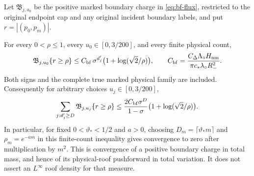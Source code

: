 Let $\mathfrak B_{j,u_0}$ be the positive marked boundary charge in
\eqref{eq:bf-flux}, restricted to the original endpoint cap and any
original incident boundary labels, and put $r=|(p_0,p_m)|$.

\begin{theorem}
\label{thm:bf-truncated}
For every
$0<\rho\le1$, every $u_0\in[0,3/200]$, and every finite physical
count,
\begin{equation}\label{eq:bf-truncated}
 \mathfrak B_{j,u_0}\{r\ge\rho\}
 \le C_{\rm bf}\,\sigma^{d'_j}
                   \bigl(1+\log(\sqrt2/\rho)\bigr),\qquad
 C_{\rm bf}=
 \frac{C_\Delta\Lambda_\circ H_{\rm nm}}
      {\pi c_*\lambda_\circ R_-^2}.
\end{equation}
Both signs and the complete true marked physical family are included.
Consequently for arbitrary choices $u_j\in[0,3/200]$,
\begin{equation}\label{eq:bf-depth-sum}
 \sum_{j:d'_j\ge D}\mathfrak B_{j,u_j}\{r\ge\rho\}
 \le\frac{2C_{\rm bf}\sigma^D}{1-\sigma}
                       \bigl(1+\log(\sqrt2/\rho)\bigr).
\end{equation}
In particular, for fixed $0<\vartheta_*<1/2$ and $a>0$, choosing
$D_m=\lceil\vartheta_*m\rceil$ and $\rho_m=e^{-am}$ in this
finite-count inequality gives convergence to zero after multiplication
by $m^2$.  This is convergence of a positive boundary charge in total
mass, and hence of its physical-roof pushforward in total variation.
It does not assert an $L^\infty$ roof density for that measure.
\end{theorem}
